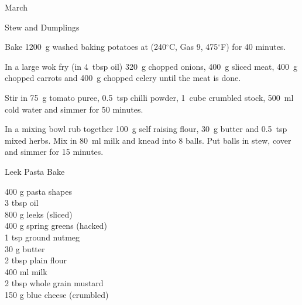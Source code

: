 \begin{menu}{March}
\begin{recipe}{2}{Stew and Dumplings}
    \begin{instructions}
    \item 
    Bake
    1200~g washed baking potatoes
    at
    (240$^{\circ}$C, Gas 9, 475$^{\circ}$F) for 40 minutes.
  \item 
        In a large wok fry
        (in 4~tbsp  oil)
        320~g chopped onions,
        400~g sliced meat,
        400~g chopped carrots
        and
        400~g chopped celery
        until the meat is done.
      \item 
        Stir in
        75~g  tomato puree,
        0.5~tsp  chilli powder,
        1~cube crumbled stock,
        500~ml  cold water
        and simmer for 50 minutes.
      \item 
        In a mixing bowl rub together
        100~g  self raising flour,
        30~g  butter
        and
        0.5~tsp  mixed herbs.
        Mix in
        80~ml  milk
        and knead into 8 balls.
        Put balls in stew, cover and
        simmer for 15 minutes.
      
    \end{instructions}
    \end{recipe}%
  
    \begin{recipe}{2}{Leek Pasta Bake}%
		\begin{ingredients}
		400 g pasta shapes  \\
	3 tbsp oil  \\
	800 g leeks (sliced) \\
	400 g spring greens (hacked) \\
	1 tsp ground nutmeg  \\
	30 g butter  \\
	2 tbsp plain flour  \\
	400 ml milk  \\
	2 tbsp whole grain mustard  \\
	150 g blue cheese (crumbled) \\
	
		\end{ingredients}
	
	

\end{recipe}
\end{menu}
